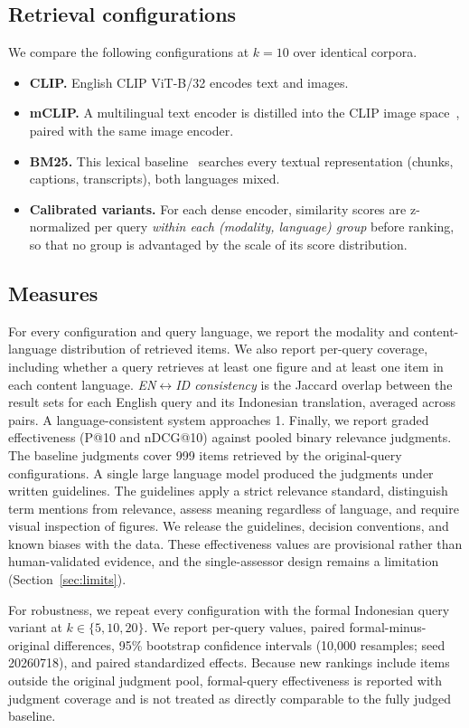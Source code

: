 \documentclass[conference]{IEEEtran}
\begin{document}
\subsection{Retrieval configurations}
We compare the following configurations at $k{=}10$ over identical corpora.
\begin{itemize}
  \item \textbf{CLIP.} English CLIP ViT-B/32 encodes text and images.
  \item \textbf{mCLIP.} A multilingual text encoder is distilled into the CLIP
  image space~\cite{mclip}, paired with the same image encoder.
  \item \textbf{BM25.} This lexical baseline~\cite{bm25} searches every textual
  representation (chunks, captions, transcripts), both languages mixed.
  \item \textbf{Calibrated variants.} For each dense encoder, similarity
  scores are z-normalized per query \emph{within each (modality, language)
  group} before ranking, so that no group is advantaged by the scale of its
  score distribution.
\end{itemize}

\subsection{Measures}
For every configuration and query language, we report the modality and
content-language distribution of retrieved items. We also report per-query
coverage, including whether a query retrieves at least one figure and at
least one item in each content language. \emph{EN$\leftrightarrow$ID
consistency} is the Jaccard overlap between the result sets for each English
query and its Indonesian translation, averaged across pairs. A
language-consistent system approaches 1. Finally, we report graded
effectiveness (P@10 and nDCG@10) against pooled binary relevance judgments.
The baseline judgments cover 999 items retrieved by the original-query
configurations. A single large language model produced the judgments under
written guidelines. The guidelines apply a strict relevance standard,
distinguish term mentions from relevance, assess meaning regardless of
language, and require visual inspection of figures. We release the
guidelines, decision conventions, and known biases with the data. These
effectiveness values are provisional rather than human-validated evidence,
and the single-assessor design remains a limitation
(Section~\ref{sec:limits}).

For robustness, we repeat every configuration with the formal Indonesian
query variant at $k\in\{5,10,20\}$. We report per-query values, paired
formal-minus-original differences, 95\% bootstrap confidence intervals
(10{,}000 resamples; seed 20260718), and paired standardized effects. Because
new rankings include items outside the original judgment pool, formal-query
effectiveness is reported with judgment coverage and is not treated as
directly comparable to the fully judged baseline.
\end{document}
